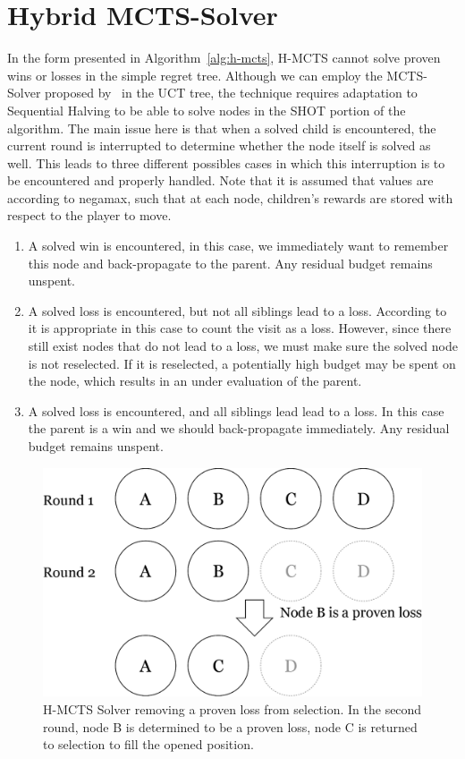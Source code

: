 \documentclass{kecsmstr}
\begin{document}
\section{Hybrid MCTS-Solver}
\label{sec:hybmctssolver}

In the form presented in Algorithm~\ref{alg:h-mcts}, H-MCTS cannot solve proven wins or losses in the simple regret tree. Although we can employ the MCTS-Solver proposed by~ in the UCT tree, the technique requires adaptation to Sequential Halving to be able to solve nodes in the SHOT portion of the algorithm. The main issue here is that when a solved child is encountered, the current round is interrupted to determine whether the node itself is solved as well. This leads to three different possibles cases in which this interruption is to be encountered and properly handled. Note that it is assumed that values are according to negamax, such that at each node, children's rewards are stored with respect to the player to move.
\begin{enumerate}
\item A solved win is encountered, in this case, we immediately want to remember this node and back-propagate to the parent. Any residual budget remains unspent.
\item A solved loss is encountered, but not all siblings lead to a loss. According to~ it is appropriate in this case to count the visit as a loss. However, since there still exist nodes that do not lead to a loss, we must make sure the solved node is not reselected. If it is reselected, a potentially high budget may be spent on the node, which results in an under evaluation of the parent.
\item A solved loss is encountered, and all siblings lead lead to a loss. In this case the parent is a win and we should back-propagate immediately. Any residual budget remains unspent.
\end{enumerate}
\begin{figure}[hb]
	\centering
	\includegraphics[width=.6\textwidth]{img/solver.png}
	\caption{H-MCTS Solver removing a proven loss from selection. In the second round, node B is determined to be a proven loss, node C is returned to selection to fill the opened position.}
	\label{fig:h-mcts_solver}
\end{figure}
\end{document}
